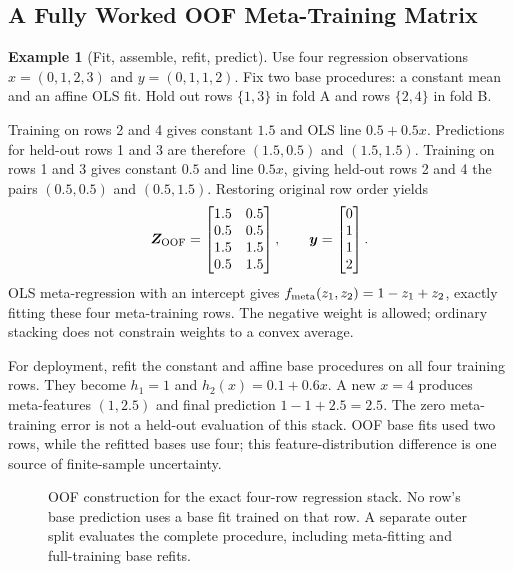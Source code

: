 \documentclass[11pt,twoside]{article}
\numberwithin{equation}{section}
\newcommand{\vect}[1]{\bm{#1}}
\newcommand{\mat}[1]{\bm{#1}}
\theoremstyle{plain}
\theoremstyle{definition}
\newtheorem{example}[theorem]{Example}
\theoremstyle{remark}
\begin{document}
\subsection{A Fully Worked OOF Meta-Training Matrix}
\label{sec:stacking-oof}
\begin{example}[Fit, assemble, refit, predict]
Use four regression observations $x=(0,1,2,3)$ and $y=(0,1,1,2)$. Fix two base procedures: a constant mean and an affine OLS fit. Hold out rows $\{1,3\}$ in fold A and rows $\{2,4\}$ in fold B.

Training on rows 2 and 4 gives constant $1.5$ and OLS line $0.5+0.5x$. Predictions for held-out rows 1 and 3 are therefore $(1.5,0.5)$ and $(1.5,1.5)$. Training on rows 1 and 3 gives constant $0.5$ and line $0.5x$, giving held-out rows 2 and 4 the pairs $(0.5,0.5)$ and $(0.5,1.5)$. Restoring original row order yields
\[
\mat Z_{\rm OOF}=\begin{bmatrix}1.5&0.5\\0.5&0.5\\1.5&1.5\\0.5&1.5\end{bmatrix},
\qquad\vect y=\begin{bmatrix}0\\1\\1\\2\end{bmatrix}.
\]
OLS meta-regression with an intercept gives $f_{\rm meta}(z_1,z_2)=1-z_1+z_2$, exactly fitting these four meta-training rows. The negative weight is allowed; ordinary stacking does not constrain weights to a convex average.

For deployment, refit the constant and affine base procedures on all four training rows. They become $h_1=1$ and $h_2(x)=0.1+0.6x$. A new $x=4$ produces meta-features $(1,2.5)$ and final prediction $1-1+2.5=2.5$. The zero meta-training error is not a held-out evaluation of this stack. OOF base fits used two rows, while the refitted bases use four; this feature-distribution difference is one source of finite-sample uncertainty.
\end{example}

\begin{figure}[H]
\centering
{}
\caption{OOF construction for the exact four-row regression stack. No row's base prediction uses a base fit trained on that row. A separate outer split evaluates the complete procedure, including meta-fitting and full-training base refits.}
\end{figure}
\end{document}
